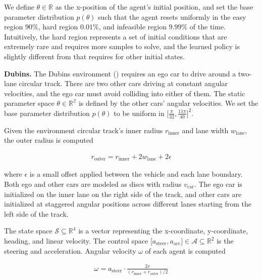 \documentclass{article} %
\let\Cref\crtCref
\newcommand{\dubins}{\textsf{\small{Dubins}}}
\newcommand*{\XSet}{\mathcal{X}}
\newcommand*{\USet}{\mathcal{U}}
\def\XSet{{\mathcal{S}}}
\def\USet{{\mathcal{A}}}
\begin{document}
We define $\theta \in \mathbb{R}$ as the x-position of the agent's initial position, and
set the base parameter distribution $p(\theta)$ such that the agent resets uniformly in the easy region $90\%$, hard region $0.01\%$, and infeasible region $9.99\%$ of the time. 
Intuitively, the hard region represents a set of initial conditions that are extremely rare and requires more samples to solve, and the learned policy is slightly different from that requires for other initial states.


\textbf{\dubins{}.} 
The \dubins{} environment (\Cref{fig:app:dubins}) requires an ego car to drive around a two-lane circular track. 
There are two other cars driving at constant angular velocities, and the ego car must avoid colliding into either of them.
The static parameter space $\theta \in \mathbb{R^2}$ is defined by the other cars' angular velocities.
We set the base parameter distribution $p(\theta)$ to be uniform in $\big[\frac{\pi}{32}, \frac{11 \pi}{40}\big]^2$.

Given the environment circular track's inner radius $r_{\text{inner}}$ and lane width $w_{\text{lane}}$, the outer radius is computed

\begin{equation}
    \nonumber
    \begin{aligned}
        r_{\text{outer}} = r_{\text{inner}} + 2 w_{\text{lane}} + 2\epsilon
    \end{aligned}
\end{equation}

where $\epsilon$ is a small offset applied between the vehicle and each lane boundary.
Both ego and other cars are modeled as discs with radius $v_{\text{car}}$.
The ego car is initialized on the inner lane on the right side of the track, and other cars are initialized at staggered angular positions across different lanes starting from the left side of the track.


The state space $\XSet \subseteq \mathbb{R}^{4}$ is a vector representing the x-coordinate, y-coordinate, heading, and linear velocity.
The control space $\big[ a_{\text{steer}}, a_{\text{acc}} \big] \in \USet \subseteq \mathbb{R}^2$ is the steering and acceleration.
Angular velocity $\omega$ of each agent is computed

\begin{equation}
    \nonumber
    \begin{aligned}
        \omega = a_{\text{steer}} \cdot \frac{2v}{(r_{\text{inner}} + r_{\text{outer}}) / 2}
    \end{aligned}
\end{equation}
\end{document}
